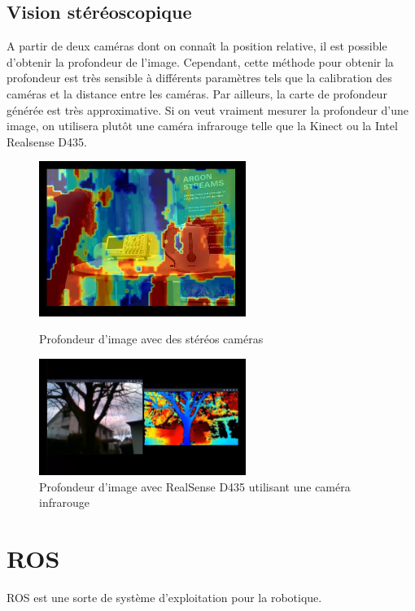 \documentclass[a4paper, 11pt]{report}
\begin{document}
\section{Vision stéréoscopique}
A partir de deux caméras dont on connaît la position relative, il est possible d'obtenir la profondeur de l'image. Cependant, cette méthode pour obtenir la profondeur est très sensible à différents paramètres tels que la calibration des caméras et la distance entre les caméras. Par ailleurs, la carte de profondeur générée est très approximative. Si on veut vraiment mesurer la profondeur d'une image, on utilisera plutôt une caméra infrarouge telle que la Kinect ou la Intel Realsense D435.

\begin{figure}[h]
\begin{centering}
\includegraphics[width=0.6\textwidth]{images/depthMapStereo.jpg}
\caption{Profondeur d'image avec des stéréos caméras}
\includegraphics[width=0.6\textwidth]{images/depthMapRealSense.jpg}
\caption{Profondeur d'image avec RealSense D435 utilisant une caméra infrarouge}
\par\end{centering}
\end{figure}

\chapter{ROS}

ROS est une sorte de système d'exploitation pour la robotique.
\end{document}
